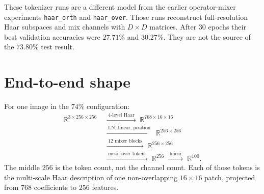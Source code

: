 \documentclass[11pt]{article}
\begin{document}
These tokenizer runs are a different model from the earlier operator-mixer
experiments \texttt{haar\_orth} and \texttt{haar\_over}. Those runs reconstruct
full-resolution Haar subspaces and mix channels with $D\times D$ matrices.
After $30$ epochs their best validation accuracies were $27.71\%$ and
$30.27\%$. They are not the source of the $73.80\%$ test result.

\section{End-to-end shape}

For one image in the $74\%$ configuration:
\begin{equation}
\begin{aligned}
\mathbb R^{3\times256\times256}
&\;\xrightarrow{\;\text{4-level Haar}\;}\;
\mathbb R^{768\times16\times16}\\
&\;\xrightarrow{\;\text{LN, linear, position}\;}\;
\mathbb R^{256\times256}\\
&\;\xrightarrow{\;\text{12 mixer blocks}\;}\;
\mathbb R^{256\times256}\\
&\;\xrightarrow{\;\text{mean over tokens}\;}\;
\mathbb R^{256}
\;\xrightarrow{\;\text{linear}\;}\;
\mathbb R^{100}.
\end{aligned}
\end{equation}
The middle $256$ is the token count, not the channel count. Each of those
tokens is the multi-scale Haar description of one non-overlapping $16\times16$
patch, projected from $768$ coefficients to $256$ features.
\end{document}
